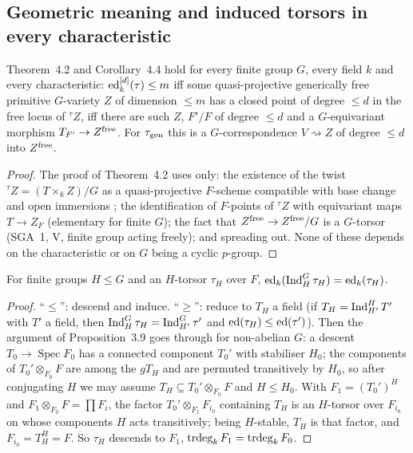 \subsection{Geometric meaning and induced torsors in every characteristic}

\begin{theorem}\label{thm:geom}
Theorem~4.2 and Corollary~4.4 hold for every finite group $G$, every field $k$ and
every characteristic: $\operatorname{ed}^{[d]}_k(\tau)\le m$ iff some quasi-projective generically free
primitive $G$-variety $Z$ of dimension $\le m$ has a closed point of degree $\le d$ in
the free locus of ${}^\tau Z$, iff there are such $Z$, $F'/F$ of degree $\le d$ and a
$G$-equivariant morphism $T_{F'}\to Z^{\rm free}$. For $\tau_{\mathrm{gen}}$ this is a
$G$-correspondence $V\rightsquigarrow Z$ of degree $\le d$ into $Z^{\rm free}$.
\end{theorem}

\begin{proof}
The proof of Theorem~4.2 uses only: the existence of the twist ${}^\tau Z=(T\times_kZ)/G$
as a quasi-projective $F$-scheme compatible with base change and open immersions
\cite[\S3]{DR}; the identification of $F$-points of ${}^\tau Z$ with equivariant maps
$T\to Z_F$ (elementary for finite $G$); the fact that $Z^{\rm free}\to Z^{\rm free}/G$
is a $G$-torsor (SGA~1, V, finite group acting freely); and spreading out. None of
these depends on the characteristic or on $G$ being a cyclic $p$-group.
\end{proof}

\begin{lemma}\label{lem:ind}
For finite groups $H\le G$ and an $H$-torsor $\tau_H$ over $F$,
$\operatorname{ed}_k(\operatorname{Ind}_H^G\tau_H)=\operatorname{ed}_k(\tau_H)$.
\end{lemma}

\begin{proof}
``$\le$'': descend and induce. ``$\ge$'': reduce to $T_H$ a field (if
$T_H=\operatorname{Ind}_{H'}^HT'$ with $T'$ a field, then $\operatorname{Ind}_H^G\tau_H=\operatorname{Ind}_{H'}^G\tau'$ and
$\operatorname{ed}(\tau_H)\le\operatorname{ed}(\tau')$). Then the argument of Proposition~3.9 goes through for
non-abelian $G$: a descent $T_0\to\operatorname{Spec}F_0$ has a connected component
$T_0'$ with stabiliser $H_0$; the components of $T_0'\otimes_{F_0}F$ are among the
$gT_H$ and are permuted transitively by $H_0$, so after conjugating $H$ we may assume
$T_H\subseteq T_0'\otimes_{F_0}F$ and $H\le H_0$. With $F_1=(T_0')^H$ and
$F_1\otimes_{F_0}F=\prod F_i$, the factor $T_0'\otimes_{F_1}F_{i_0}$ containing $T_H$
is an $H$-torsor over $F_{i_0}$ on whose components $H$ acts transitively; being
$H$-stable, $T_H$ is that factor, and $F_{i_0}=T_H^H=F$. So $\tau_H$ descends to
$F_1$, $\operatorname{trdeg}_kF_1=\operatorname{trdeg}_kF_0$.
\end{proof}

